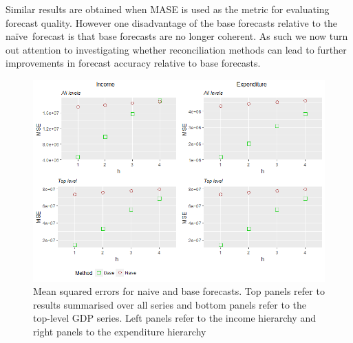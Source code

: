 \documentclass[graybox]{svmult}
\def\naive{na\"{i}ve\ }
\begin{document}
Similar results are obtained when MASE is used as the metric for evaluating forecast quality.  However one disadvantage of the base forecasts relative to the \naive forecast is that base forecasts are no longer coherent.  As such we now turn out attention to investigating whether reconciliation methods can lead to further improvements in forecast accuracy relative to base forecasts.


\begin{figure}[t]
	\centering
	\small
	\includegraphics[width=\textwidth]{Figs/Results/NaiveVsBase_MSE.png}
	\caption{Mean squared errors for naive and base forecasts. Top panels refer to results summarised over all series and bottom panels refer to the top-level GDP series.  Left panels refer to the income hierarchy and right panels to the expenditure hierarchy}\label{fig: NaiveVsBase_MSE}
\end{figure}


\end{document}
